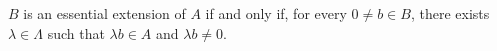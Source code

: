 $B$ is an essential extension of $A$ if and only if, for every $0 \neq b \in B$, there exists $\lambda \in \Lambda$ such that $\lambda b \in A$ and $\lambda b \neq 0$.
